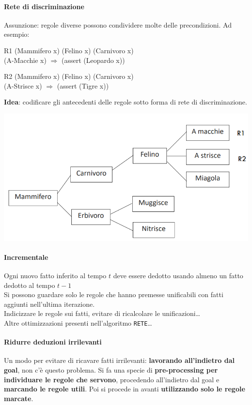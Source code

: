 \documentclass[10pt]{book}
\begin{document}
\paragraph{Rete di discriminazione} Assunzione: regole diverse possono condividere molte delle precondizioni. Ad esempio:
\begin{list}{}{}
	\item[R1] (Mammifero x) (Felino x) (Carnivoro x)\\
	(A-Macchie x) $\Rightarrow$ (assert (Leopardo x))
	\item[R2] (Mammifero x) (Felino x) (Carnivoro x)\\
	(A-Strisce x) $\Rightarrow$ (assert (Tigre x))
\end{list}
\textbf{Idea}: codificare gli antecedenti delle regole sotto forma di rete di discriminazione.
\begin{center}
	\includegraphics[scale=0.7]{fcdiscriminazione.png}
\end{center}
\paragraph{Incrementale} Ogni nuovo fatto inferito al tempo $t$ deve essere dedotto usando almeno un fatto dedotto al tempo $t-1$\\
Si possono guardare solo le regole che hanno premesse unificabili con fatti aggiunti nell'ultima iterazione.\\
Indicizzare le regole sui fatti, evitare di ricalcolare le unificazioni\ldots\\
Altre ottimizzazioni presenti nell'algoritmo \texttt{RETE}\ldots
\paragraph{Ridurre deduzioni irrilevanti} Un modo per evitare di ricavare fatti irrilevanti: \textbf{lavorando all'indietro dal goal}, non c'è questo problema. Si fa una specie di \textbf{pre-processing per individuare le regole che servono}, procedendo all'indietro dal goal e \textbf{marcando le regole utili}. Poi si procede in avanti \textbf{utilizzando solo le regole marcate}.
\end{document}
